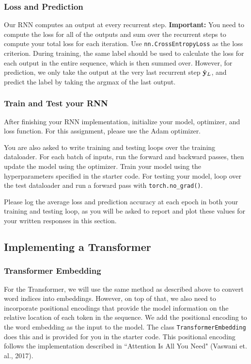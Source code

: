 \subsubsection{Loss and Prediction} Our RNN computes an output at every recurrent step. \textbf{Important:} You need to compute the loss for all of the outputs and sum over the recurrent steps to compute your total loss for each iteration. Use \texttt{nn.CrossEntropyLoss} as the loss criterion. During training, the same label should be used to calculate the loss for each output in the entire sequence, which is then summed over. However, for prediction, we only take the output at the very last recurrent step $\hat{\mathbf{y}}_L$, and predict the label by taking the argmax of the last output.

\subsubsection{Train and Test your RNN} 

After finishing your RNN implementation, initialize your model, optimizer, and loss function. For this assignment, please use the Adam optimizer. 

You are also asked to write training and testing loops over the training dataloader. For each batch of inputs, run the forward and backward passes, then update the model using the optimizer. Train your model using the hyperparameters specified in the starter code. For testing your model, loop over the test dataloader and run a forward pass with \texttt{torch.no\_grad()}. 

Please log the average loss and prediction accuracy at each epoch in both your training and testing loop, as you will be asked to report and plot these values for your written responses in this section.

\subsection{Implementing a Transformer}

\subsubsection{Transformer Embedding} 

For the Transformer, we will use the same method as described above to convert word indices into embeddings. However, on top of that, we also need to incorporate positional encodings that provide the model information on the relative location of each token in the sequence. We add the positional encoding to the word embedding as the input to the model. The class \texttt{TransformerEmbedding} does this and is provided for you in the starter code. This positional encoding  follows the implementation described in ``Attention Is All You Need" (Vaswani et. al., 2017).

